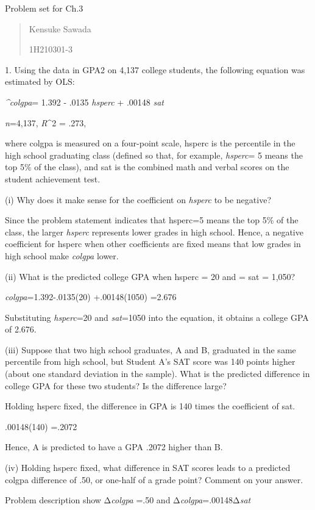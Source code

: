 \documentclass[
]{article}
\author{}
\date{}
\begin{document}
Problem set for Ch.3

\begin{quote}
Kensuke Sawada

1H210301-3
\end{quote}

1. Using the data in GPA2 on 4,137 college students, the following
equation was estimated by OLS:

\emph{\^{}colgpa}= 1.392 - .0135 \emph{hsperc} + .00148 \emph{sat}

\emph{n}=4,137, \emph{R}\^{}2 = .273,

where colgpa is measured on a four-point scale, hsperc is the percentile
in the high school graduating class (defined so that, for example,
\emph{hsperc}= 5 means the top 5\% of the class), and sat is the
combined math and verbal scores on the student achievement test.

(i) Why does it make sense for the coefficient on \emph{hsperc} to be
negative?

Since the problem statement indicates that hsperc=5 means the top 5\% of
the class, the larger \emph{hsperc} represents lower grades in high
school. Hence, a negative coefficient for hsperc when other coefficients
are fixed means that low grades in high school make \emph{colgpa} lower.

(ii) What is the predicted college GPA when hsperc = 20 and = sat =
1,050?

\emph{colgpa}=1.392-.0135(20) +.00148(1050) =2.676

Substituting \emph{hsperc}=20 and \emph{sat}=1050 into the equation, it
obtains a college GPA of 2.676.

(iii) Suppose that two high school graduates, A and B, graduated in the
same percentile from high school, but Student A's SAT score was 140
points higher (about one standard deviation in the sample). What is the
predicted difference in college GPA for these two students? Is the
difference large?

Holding hsperc fixed, the difference in GPA is 140 times the coefficient
of sat.

.00148(140) =.2072

Hence, A is predicted to have a GPA .2072 higher than B.

(iv) Holding hsperc fixed, what difference in SAT scores leads to a
predicted colgpa difference of .50, or one-half of a grade point?
Comment on your answer.

Problem description show Δ\emph{colgpa} =.50 and
Δ\emph{colgpa}=.00148Δ\emph{sat}
\end{document}
